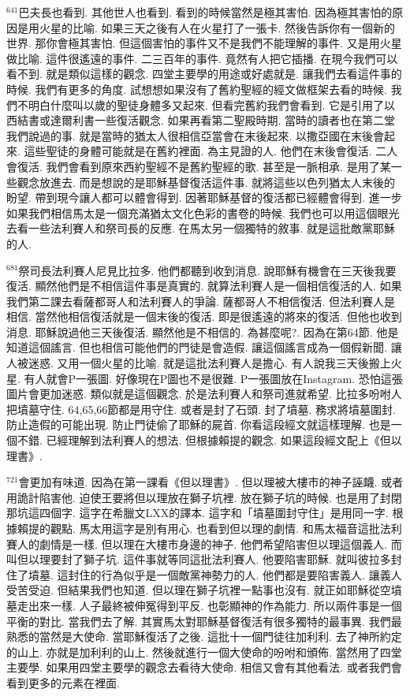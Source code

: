 \documentclass{book}
\begin{document}
$^{641}$巴夫長也看到.
其他世人也看到.
看到的時候當然是極其害怕.
因為極其害怕的原因是用火星的比喻.
如果三天之後有人在火星打了一張卡.
然後告訴你有一個新的世界.
那你會極其害怕.
但這個害怕的事件又不是我們不能理解的事件.
又是用火星做比喻.
這件很遙遠的事件.
二三百年的事件.
竟然有人把它插播.
在現今我們可以看不到.
就是類似這樣的觀念.
四堂主要學的用途或好處就是.
讓我們去看這件事的時候.
我們有更多的角度.
試想想如果沒有了舊約聖經的經文做框架去看的時候.
我們不明白什麼叫以歲的聖徒身體多又起來.
但看完舊約我們會看到.
它是引用了以西結書或達爾利書一些復活觀念.
如果再看第二聖殿時期.
當時的讀者也在第二堂我們說過的事.
就是當時的猶太人很相信亞當會在末後起來.
以撒亞國在末後會起來.
這些聖徒的身體可能就是在舊約裡面.
為主見證的人.
他們在末後會復活.
二人會復活.
我們會看到原來西約聖經不是舊約聖經的歌.
甚至是一脈相承.
是用了某一些觀念放進去.
而是想說的是耶穌基督復活這件事.
就將這些以色列猶太人末後的盼望.
帶到現今讓人都可以體會得到.
因著耶穌基督的復活都已經體會得到.
進一步如果我們相信馬太是一個充滿猶太文化色彩的書卷的時候.
我們也可以用這個眼光去看一些法利賽人和祭司長的反應.
在馬太另一個獨特的敘事.
就是這批敵黨耶穌的人.

$^{681}$祭司長法利賽人尼見比拉多.
他們都聽到收到消息.
說耶穌有機會在三天後我要復活.
顯然他們是不相信這件事是真實的.
就算法利賽人是一個相信復活的人.
如果我們第二課去看薩都哥人和法利賽人的爭論.
薩都哥人不相信復活.
但法利賽人是相信.
當然他相信復活就是一個末後的復活.
即是很遙遠的將來的復活.
但他也收到消息.
耶穌說過他三天後復活.
顯然他是不相信的.
為甚麼呢?.
因為在第64節.
他是知道這個謠言.
但也相信可能他們的門徒是會造假.
讓這個謠言成為一個假新聞.
讓人被迷惑.
又用一個火星的比喻.
就是這批法利賽人是擔心.
有人說我三天後搬上火星.
有人就會P一張圖.
好像現在P圖也不是很難.
P一張圖放在Instagram.
恐怕這張圖片會更加迷惑.
類似就是這個觀念.
於是法利賽人和祭司進就希望.
比拉多吩咐人把墳墓守住.
64,65,66節都是用守住.
或者是封了石頭.
封了墳墓.
務求將墳墓圍封.
防止造假的可能出現.
防止門徒偷了耶穌的屍首.
你看這段經文就這樣理解.
也是一個不錯.
已經理解到法利賽人的想法.
但根據賴提的觀念.
如果這段經文配上《但以理書》.

$^{721}$會更加有味道.
因為在第一課看《但以理書》.
但以理被大樓市的神子誣衊.
或者用詭計陷害他.
迫使王要將但以理放在獅子坑裡.
放在獅子坑的時候.
也是用了封閉那坑這四個字.
這字在希臘文LXX的譯本.
這字和「墳墓圍封守住」是用同一字.
根據賴提的觀點.
馬太用這字是別有用心.
也看到但以理的劇情.
和馬太福音這批法利賽人的劇情是一樣.
但以理在大樓市身邊的神子.
他們希望陷害但以理這個義人.
而叫但以理要封了獅子坑.
這件事就等同這批法利賽人.
他要陷害耶穌.
就叫彼拉多封住了墳墓.
這封住的行為似乎是一個敵黨神勢力的人.
他們都是要陷害義人.
讓義人受苦受迫.
但結果我們也知道.
但以理在獅子坑裡一點事也沒有.
就正如耶穌從空墳墓走出來一樣.
人子最終被伸冤得到平反.
也彰顯神的作為能力.
所以兩件事是一個平衡的對比.
當我們去了解.
其實馬太對耶穌基督復活有很多獨特的最事異.
我們最熟悉的當然是大使命.
當耶穌復活了之後.
這批十一個門徒往加利利.
去了神所約定的山上.
亦就是加利利的山上.
然後就進行一個大使命的吩咐和頒佈.
當然用了四堂主要學.
如果用四堂主要學的觀念去看待大使命.
相信又會有其他看法.
或者我們會看到更多的元素在裡面.
\end{document}
